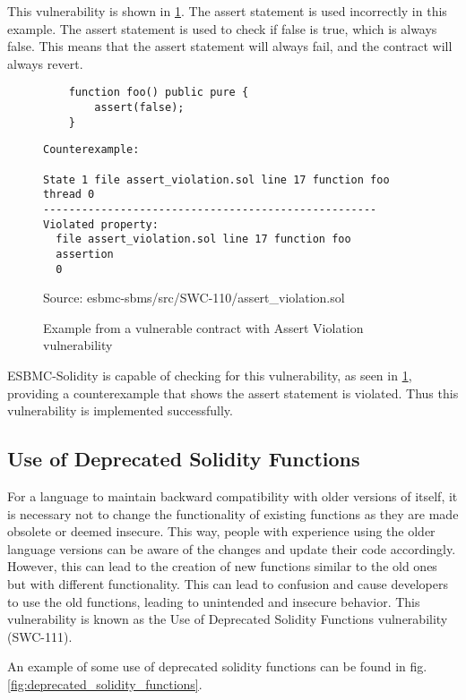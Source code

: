 This vulnerability is shown in \ref{fig:assert_violation}. The assert statement is used incorrectly in this example. The assert statement is used to check if false is true, which is always false. This means that the assert statement will always fail, and the contract will always revert. 

\begin{figure}
\begin{lstlisting}
    function foo() public pure {
        assert(false);
    }
\end{lstlisting}

\begin{lstlisting}
Counterexample:

State 1 file assert_violation.sol line 17 function foo thread 0
----------------------------------------------------
Violated property:
  file assert_violation.sol line 17 function foo
  assertion
  0
\end{lstlisting}
\caption{Example from a vulnerable contract with Assert Violation vulnerability }
Source: esbmc-sbms/src/SWC-110/assert\_violation.sol
\label{fig:assert_violation}
\end{figure}

ESBMC-Solidity is capable of checking for this vulnerability, as seen in \ref{fig:assert_violation}, providing a counterexample that shows the assert statement is violated. Thus this vulnerability is implemented successfully.

\subsection{Use of Deprecated Solidity Functions}
\label{sec:use_of_deprecated_solidity_functions}

For a language to maintain backward compatibility with older versions of itself, it is necessary not to change the functionality of existing functions as they are made obsolete or deemed insecure. This way, people with experience using the older language versions can be aware of the changes and update their code accordingly. However, this can lead to the creation of new functions similar to the old ones but with different functionality. This can lead to confusion and cause developers to use the old functions, leading to unintended and insecure behavior. This vulnerability is known as the Use of Deprecated Solidity Functions vulnerability (SWC-111). 

An example of some use of deprecated solidity functions can be found in fig. \ref{fig:deprecated_solidity_functions}. 

